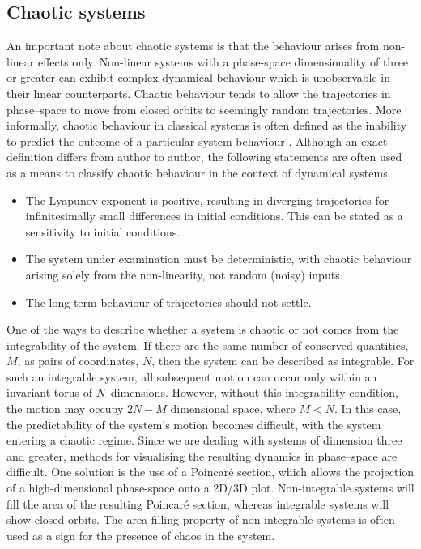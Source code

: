 \subsection{Chaotic systems}\label{ss:chaotic}
An important note about chaotic systems is that the behaviour arises from non-linear effects only. Non-linear systems with a phase-space dimensionality of three or greater can exhibit complex dynamical behaviour which is unobservable in their linear counterparts. Chaotic behaviour tends to allow the trajectories in phase--space to move from closed orbits to seemingly random trajectories. More informally, chaotic behaviour in classical systems is often defined as the inability to predict the outcome of a particular system behaviour \cite{CT:Gardiner_pra_2000}. Although an exact definition differs from author to author, the following statements are often used as a means to classify chaotic behaviour in the context of dynamical systems \cite[p. 323]{BK:Strogatz_1994}
\begin{itemize}
	\item The Lyapunov exponent is positive, resulting in diverging trajectories for infinitesimally small differences in initial conditions. This can be stated as a sensitivity to initial conditions.\vspace*{-0.5em}
	\item The system under examination must be deterministic, with chaotic behaviour arising solely from the non-linearity, not random (noisy) inputs.\vspace*{-0.5em}
	\item The long term behaviour of trajectories should not settle.
\end{itemize}

One of the ways to describe whether a system is chaotic or not comes from the integrability of the system. If there are the same number of
conserved quantities, $M$, as pairs of coordinates, $N$, then the system can be described as integrable. For such an integrable system, all subsequent motion can occur only within an invariant torus of $N$--dimensions. However, without this integrability condition, the motion may occupy $2N-M$ dimensional space, where $M<N$. In this case, the predictability of the system's motion becomes difficult, with the system entering a chaotic regime. Since we are dealing with systems of dimension three and greater, methods for visualising the resulting dynamics in phase--space are difficult. One solution is the use of a Poincar\'e section, which allows the projection of a high-dimensional phase-space onto a 2D/3D plot. Non-integrable systems will fill the area of the resulting Poincar\'e section, whereas integrable systems will show closed orbits. The area-filling property of non-integrable systems is often used as a sign for the presence of chaos in the system.

